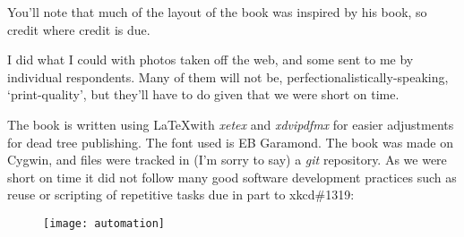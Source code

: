 You'll note that much of the layout of the book was inspired by his book,
so credit where credit is due.

I did what I could with photos taken off the web, and some sent to me by
individual respondents.  Many of them will not be,
perfectionalistically-speaking, `print-quality', but they'll have to do given
that we were short on time.

The book is written using \LaTeX with {\em xetex} and {\em xdvipdfmx} for
easier adjustments for dead tree publishing.  The font used is EB Garamond.
The book was made on Cygwin, and files were tracked in (I'm sorry to say) a
{\em git} repository.  As we were short on time it did not follow many good
software development practices such as reuse or scripting of repetitive tasks
due in part to xkcd\#1319:
\begin{figure}[h!]
\centering
\texttt{[image: automation]}
\end{figure}


